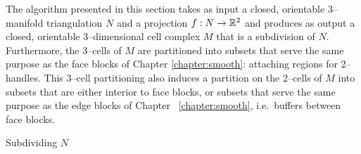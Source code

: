 The algorithm presented in this section takes as input a closed, orientable 3--manifold triangulation $N$ and a projection $f:N\to\mathbb{R}^2$ and produces as output a closed, orientable 3--dimensional cell complex $M$ that is a subdivision of $N$.
Furthermore, the 3--cells of $M$ are partitioned into subsets that serve the same purpose as the face blocks of Chapter \ref{chapter:smooth}: attaching regions for 2--handles.
This 3--cell partitioning also induces a partition on the 2--cells of $M$ into subsets that are either interior to face blocks, or subsets that serve the same purpose as the edge blocks of Chapter ~\ref{chapter:smooth}, i.e.\ buffers between face blocks.

\begin{algorithm}
	\caption{Subdividing $N$}
	\label{alg:subdividing-manifold}
\end{algorithm}



